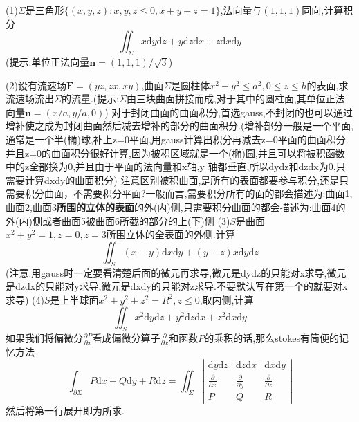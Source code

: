 \documentclass{ctexart}
\begin{document}
(1)$\Sigma$是三角形$\{(x,y,z):x,y,z\leq0,x+y+z=1\}$,法向量与$(1,1,1)$同向,计算积分
$$\iint_{\Sigma}x\mathrm{d}y\mathrm{d}z+y\mathrm{d}z\mathrm{d}x+z\mathrm{d}x\mathrm{d}y$$
(提示:单位正法向量$\bm{n}=(1,1,1)/\sqrt{3}$)

(2)设有流速场$\bm{F}=(yz,zx,xy)$,曲面$\Sigma$是圆柱体$x^{2}+y^{2}\leq a^{2},0\leq z\leq h$的表面,求流速场流出$\Sigma$的流量.(提示:$\Sigma$由三块曲面拼接而成,对于其中的圆柱面,其单位正法向量$\bm{n}=(x/a,y/a,0)$)
\newline
\newline
\newline
对于封闭曲面的曲面积分,首选gauss,不封闭的也可以通过增补使之成为封闭曲面然后减去增补的部分的曲面积分.(增补部分一般是一个平面,通常是一个半(椭)球,补上z=0平面,用gauss计算出积分再减去z=0平面的曲面积分.并且z=0的曲面积分很好计算,因为被积区域就是一个(椭)圆,并且可以将被积函数中的z全部换为0,并且由于平面的法向量和x轴,y 轴都垂直,所以dydz和dzdx为0,只需要计算dxdy的曲面积分)
\newline
\newline
注意区别被积曲面,是所有的表面都要参与积分,还是只需要积分曲面，不需要积分平面?一般而言,需要积分所有的面的都会描述为:曲面1,曲面2,曲面3\textbf{所围的立体的表面}的外(内)侧,只需要积分曲面的都会描述为:曲面4的外(内)侧或者曲面5被曲面6所截的部分的上(下)侧
\newline
\newline
(3)$S$是曲面$x^{2}+y^{2}=1,z=0,z=3$所围立体的全表面的外侧.计算$$\iint_{S}(x-y)\mathrm{d}x\mathrm{d}y+(y-z)x\mathrm{d}y\mathrm{d}z$$
(注意:用gauss时一定要看清楚后面的微元再求导,微元是dydz的只能对x求导,微元是dzdx的只能对y求导,微元是dxdy的只能对z求导.不要默认写在第一个的就要对x求导)
\newline
\newline
(4)$S$是上半球面$x^{2}+y^{2}+z^{2}=R^{2},z\leq 0$,取内侧,计算$$\iint_{S}x^{2}\mathrm{d}y\mathrm{d}z+y^{2}\mathrm{d}z\mathrm{d}x+z^{2}\mathrm{d}x\mathrm{d}y$$
\newline
\newline
如果我们将偏微分$\frac{\partial P}{\partial x}$看成偏微分算子$\frac{\partial }{\partial x}$和函数$P$的乘积的话,那么stokes有简便的记忆方法
$$\int_{\partial \Sigma}P\mathrm{d}x+Q\mathrm{d}y+R\mathrm{d}z=\iint_{\Sigma}\left|
\begin{array}{ccc}
\mathrm{d}y\mathrm{d}z&\mathrm{d}z\mathrm{d}x&\mathrm{d}x\mathrm{d}y\\
\frac{\partial }{\partial x}&\frac{\partial }{\partial y}&\frac{\partial }{\partial z}\\
P&Q&R
\end{array}
\right|$$
然后将第一行展开即为所求.
\end{document}
